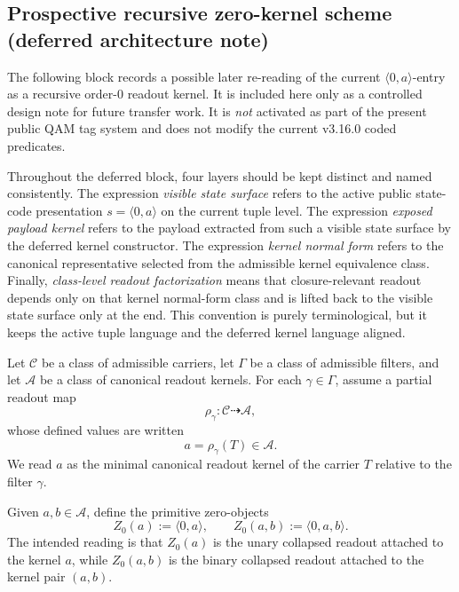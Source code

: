 \subsection*{Prospective recursive zero-kernel scheme (deferred architecture note)}

The following block records a possible later re-reading of the current $\langle 0,a\rangle$-entry as a recursive order-$0$ readout kernel. It is included here only as a controlled design note for future transfer work. It is \emph{not} activated as part of the present public QAM tag system and does not modify the current v3.16.0 coded predicates.

\begin{remark}\label{rem:qam-zero-kernel-terminology}
Throughout the deferred block, four layers should be kept distinct and named consistently. The expression \emph{visible state surface} refers to the active public state-code presentation $s=\langle 0,a\rangle$ on the current tuple level. The expression \emph{exposed payload kernel} refers to the payload extracted from such a visible state surface by the deferred kernel constructor. The expression \emph{kernel normal form} refers to the canonical representative selected from the admissible kernel equivalence class. Finally, \emph{class-level readout factorization} means that closure-relevant readout depends only on that kernel normal-form class and is lifted back to the visible state surface only at the end. This convention is purely terminological, but it keeps the active tuple language and the deferred kernel language aligned.
\end{remark}

\begin{definition}\label{def:qam-zero-kernel}
Let $\mathcal C$ be a class of admissible carriers, let $\Gamma$ be a class of admissible filters, and let $\mathcal A$ be a class of canonical readout kernels. For each $\gamma\in\Gamma$, assume a partial readout map
\[
\rho_\gamma:\mathcal C \dashrightarrow \mathcal A,
\]
whose defined values are written
\[
a=\rho_\gamma(T)\in\mathcal A.
\]
We read $a$ as the minimal canonical readout kernel of the carrier $T$ relative to the filter $\gamma$.
\end{definition}

\begin{definition}\label{def:qam-zero-objects}
Given $a,b\in\mathcal A$, define the primitive zero-objects
\[
Z_0(a):=\langle 0,a\rangle,
\qquad
Z_0(a,b):=\langle 0,a,b\rangle.
\]
The intended reading is that $Z_0(a)$ is the unary collapsed readout attached to the kernel $a$, while $Z_0(a,b)$ is the binary collapsed readout attached to the kernel pair $(a,b)$.
\end{definition}

